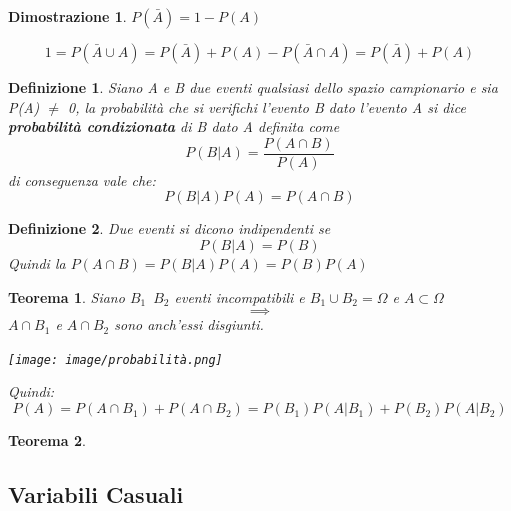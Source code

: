 \documentclass{article}
\newtheorem{definition}{Definizione}[section]
\newtheorem{teorema}{Teorema}[section]
\newtheorem{dimostrazione}{Dimostrazione}
\begin{document}
            \begin{dimostrazione}{}
                 $P(\bar{A}) = 1 - P(A)$
                
                 $$  1 = P(\bar{A}\cup A)= P(\bar{A})+P(A) - P(\bar{A}\cap A)= P(\bar{A})+P(A) 
                 $$
            \end{dimostrazione}
             \bigbreak
             
             \begin{definition}{}
             Siano A e B due eventi qualsiasi dello spazio campionario e sia P(A) $\neq$ 0, 
             la probabilità che si verifichi l'evento B dato l'evento A si dice \textbf{probabilità condizionata} di B dato A definita come
             $$P(B|A) = \frac{P(A\cap B)}{P(A)}$$
             di conseguenza vale che: 
             $$P(B|A) P(A) = P(A\cap B)$$
             \end{definition}{} 
             
             \begin{definition}{}
             Due eventi si dicono indipendenti se $$P(B|A) = P(B) $$
             Quindi la $P(A\cap B)= P(B|A)P(A)=P(B)P(A)$
             \end{definition}{} 
             
             
             \begin{teorema}{}
                Siano $B_1\,\,\,B_2$ eventi incompatibili e $B_1 \cup B_2 = \Omega$ e $A \subset \Omega$
                $$\implies$$ 
                $ A\cap B_1 $ e   $ A\cap B_2 $ sono anch'essi disgiunti. 
                \begin{center}
                             \texttt{[image: image/probabilità.png]}
                \end{center}
                
                Quindi: 
                $$
                     P(A) = P(A\cap B_1) +P(A\cap B_2) = P(B_1)P(A|B_1) +P(B_2)P(A|B_2)
                $$
                
            \end{teorema}
             
             
             \begin{teorema}{} %
             
              \end{teorema}
              \newpage
              \subsection{Variabili Casuali}
             
\end{document}
